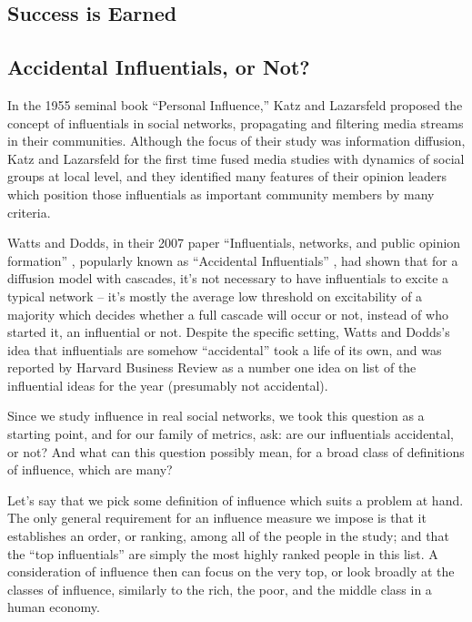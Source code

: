 \documentclass[10pt,oneside]{memoir}
\begin{document}
\begin{Spacing}{2}
\pagebreak \chapter{Success is Earned}
\label{successisearned}

\label{chapter:success-is-earned}


\section{Accidental Influentials, or Not?}
\label{accidentalinfluentialsornot}

In the 1955 seminal book ``Personal Influence,'' Katz and Lazarsfeld proposed the concept of influentials in social networks, propagating and filtering media streams in their communities.  Although the focus of their study was information diffusion, Katz and Lazarsfeld for the first time fused media studies with dynamics of social groups at local level, and they identified many features of their opinion leaders which position those influentials as important community members by many criteria.


Watts and Dodds, in their 2007 paper ``Influentials, networks, and public opinion formation'' \cite{watts2007influentials}, popularly known as ``Accidental Influentials'' \cite{hbr2007list}, had shown that for a diffusion model with cascades, it's not necessary to have influentials to excite a typical network -- it's mostly the average low threshold on excitability of a majority which decides whether a full cascade will occur or not, instead of who started it, an influential or not.  Despite the specific setting, Watts and Dodds's idea that influentials are somehow ``accidental'' took a life of its own, and was reported by Harvard Business Review as a number one idea on list of the influential ideas for the year (presumably not accidental).


Since we study influence in real social networks, we took this question as a starting point, and for our family of metrics, ask: are our influentials accidental, or not?  And what can this question possibly mean, for a broad class of definitions of influence, which are many?


Let's say that we pick some definition of influence which suits a problem at hand.  The only general requirement for an influence measure we impose is that it establishes an order, or ranking, among all of the people in the study; and that the ``top influentials'' are simply the most highly ranked people in this list.  A consideration of influence then can focus on the very top, or look broadly at the classes of influence, similarly to the rich, the poor, and the middle class in a human economy.



\end{Spacing}
\end{document}
